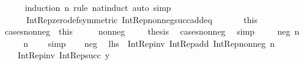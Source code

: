 \begin{isabellebody}
\ \ \ \ \isamarkupfalse%
\ {\isacharparenleft}{\kern0pt}induction\ n\ rule{\isacharcolon}{\kern0pt}\ nat{\isacharunderscore}{\kern0pt}induct{\isacharparenright}{\kern0pt}\ {\isacharparenleft}{\kern0pt}auto\ simp{\isacharcolon}{\kern0pt}\isanewline
\ \ \ \ \ \ Int{\isacharunderscore}{\kern0pt}Rep{\isacharunderscore}{\kern0pt}zero{\isacharunderscore}{\kern0pt}def{\isacharbrackleft}{\kern0pt}symmetric{\isacharbrackright}{\kern0pt}\ Int{\isacharunderscore}{\kern0pt}Rep{\isacharunderscore}{\kern0pt}nonneg{\isacharunderscore}{\kern0pt}succ{\isacharunderscore}{\kern0pt}add{\isacharunderscore}{\kern0pt}eq{\isacharparenright}{\kern0pt}\isanewline
\ \ \ \ \isamarkupfalse%
\ {}\ this\isanewline
\ \ \isacommand{{\isacharbraceright}{\kern0pt}}\isamarkupfalse%
\isanewline
\ \ \isamarkupfalse%
\ cases{\isacharunderscore}{\kern0pt}nonneg\ {\isacharequal}{\kern0pt}\ this\isanewline
\ \ \isacommand{{\isacharbraceleft}{\kern0pt}}\isamarkupfalse%
\ \isamarkupfalse%
\ {\isacharparenleft}{\kern0pt}nonneg\ {\isacharunderscore}{\kern0pt}{\isacharparenright}{\kern0pt}\ \isamarkupfalse%
\ \isamarkupfalse%
\ {\isacharquery}{\kern0pt}thesis\ \isamarkupfalse%
\ cases{\isacharunderscore}{\kern0pt}nonneg\ \isamarkupfalse%
\ simp\ \isacommand{{\isacharbraceright}{\kern0pt}}\isamarkupfalse%
\isanewline
\ \ \isamarkupfalse%
\ {\isacharparenleft}{\kern0pt}neg\ n{\isacharparenright}{\kern0pt}\isanewline
\ \ \isamarkupfalse%
\ \isamarkupfalse%
\ {\isachardoublequoteopen}n\ {\isasymin}\ {\isasymnat}{\isachardoublequoteclose}\ \isamarkupfalse%
\ simp\isanewline
\ \ \isamarkupfalse%
\ neg\ \isamarkupfalse%
\ {\isachardoublequoteopen}{\isacharquery}{\kern0pt}lhs\ {\isacharequal}{\kern0pt}\ Int{\isacharunderscore}{\kern0pt}Rep{\isacharunderscore}{\kern0pt}inv\ {\isacharparenleft}{\kern0pt}Int{\isacharunderscore}{\kern0pt}Rep{\isacharunderscore}{\kern0pt}add\ {\isacharparenleft}{\kern0pt}Int{\isacharunderscore}{\kern0pt}Rep{\isacharunderscore}{\kern0pt}nonneg\ n{\isacharparenright}{\kern0pt}\isanewline
\ \ \ \ {\isacharparenleft}{\kern0pt}Int{\isacharunderscore}{\kern0pt}Rep{\isacharunderscore}{\kern0pt}inv\ {\isacharparenleft}{\kern0pt}Int{\isacharunderscore}{\kern0pt}Rep{\isacharunderscore}{\kern0pt}succ\ y{\isacharparenright}{\kern0pt}{\isacharparenright}{\kern0pt}{\isacharparenright}{\kern0pt}{\isachardoublequoteclose}\isanewline
\ \ \ \ \isamarkupfalse%

\end{isabellebody}
